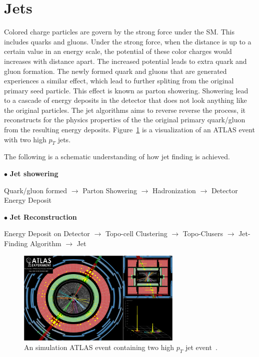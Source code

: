 \section{Jets}
\label{sec:Jet}
Colored charge particles are govern by the strong force under the SM. This includes quarks and gluons. Under the strong force, when the distance is up to a certain value in an energy scale, the potential of these color charges would increases with distance apart. The increased potential leads to extra quark and gluon formation. The newly formed quark and gluons that are generated experiences a similar effect, which lead to further spliting from the original primary seed particle. This effect is known as parton showering. 
Showering lead to a cascade of energy deposits in the detector that does not look anything like the original particles. The jet algorithms aims to reverse reverse the process, it reconstructs for the physics properties of the the original primary quark/gluon from the resulting energy deposits. Figure~\ref{fig:jetEvent} is a visualization of an ATLAS event with two high $p_{T}$ jets.

The following is a schematic understanding of how jet finding is achieved. 

$\bullet$ \textbf{Jet showering}

Quark/gluon formed $\rightarrow$  Parton Showering $\rightarrow$ Hadronization $\rightarrow$ Detector Energy Deposit

$\bullet$ \textbf{Jet Reconstruction}

Energy Deposit on Detector  $\rightarrow$  Topo-cell Clustering $\rightarrow$  Topo-Clusers $\rightarrow$  Jet-Finding Algorithm $\rightarrow$ Jet


\begin{figure}[!htb]
    \begin{center}
        \includegraphics[width=0.7\textwidth]{figures/common_ana/JetEvent}
        \caption{        
            An simulation ATLAS event containing two high $p_{T}$ jet event~\cite{jetEvent}.
        }
        \label{fig:jetEvent}
    \end{center}
\end{figure}

